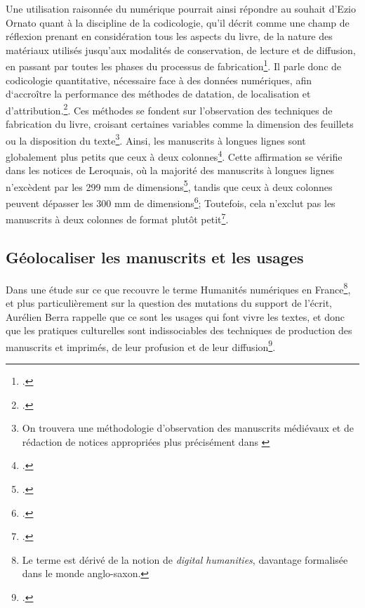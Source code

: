 \documentclass[a4paper,12pt,twoside]{book}
\begin{document}
	Une utilisation raisonnée du numérique pourrait ainsi répondre au souhait d'Ezio Ornato quant à la discipline de la codicologie, qu'il décrit comme une champ de réflexion prenant en considération tous les aspects du livre, de \og la nature des matériaux utilisés jusqu’aux modalités de conservation, de lecture et de diffusion, en passant par toutes les phases du processus de fabrication\fg{}\footcite[p. vii]{livre_medie}. Il parle donc de codicologie quantitative, nécessaire face à des données numériques, afin d‘accroître la performance des méthodes de datation, de localisation et d'attribution.\footcite[p. 41-47]{livre_medie}. Ces méthodes se fondent sur l'observation des techniques de fabrication du livre, croisant certaines variables comme la dimension des feuillets ou la disposition du texte\footnote{On trouvera une méthodologie d'observation des manuscrits médiévaux et de rédaction de notices appropriées plus précisément dans \cite{initiation_man_lit}}. Ainsi, les manuscrits à longues lignes sont globalement plus petits que ceux à deux colonnes\footcite[p. 51]{livre_medie}. Cette affirmation se vérifie dans les notices de Leroquais, où la majorité des manuscrits à longues lignes n'excèdent par les 299 mm de dimensions\footcite[Notice 145, p. 305]{Leroquais_notices}, tandis que ceux à deux colonnes peuvent dépasser les 300 mm de dimensions\footcite[Notice 5, p. 9]{Leroquais_notices}; Toutefois, cela n'exclut pas les manuscrits à deux colonnes de format plutôt petit\footcite[Notice 62, p. 150]{Leroquais_notices}. 
	
	\subsection{Géolocaliser les manuscrits et les usages}
	
	Dans une étude sur ce que recouvre le terme \og Humanités numériques\fg{} en France\footnote{Le terme est dérivé de la notion de \textit{digital humanities}, davantage formalisée dans le monde anglo-saxon.}, et plus particulièrement sur la question des mutations du support de l'écrit, Aurélien Berra rappelle que ce sont les usages qui font vivre les textes, et donc que les pratiques culturelles sont indissociables des techniques de production des manuscrits et imprimés, de leur profusion et de leur diffusion\footcite{Faire_HN}. 
	
\end{document}
